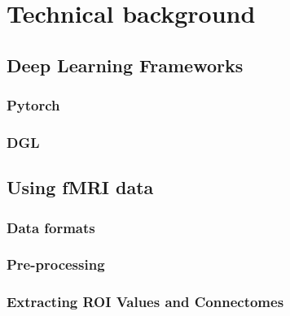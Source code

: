 \chapter{Technical background}

\section{Deep Learning Frameworks}

	\subsection{Pytorch}
	
	\subsection{DGL}

\section{Using fMRI data}

	\subsection{Data formats}
	
	\subsection{Pre-processing}
	
	\subsection{Extracting ROI Values and Connectomes}